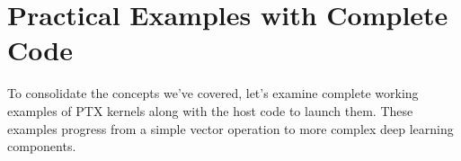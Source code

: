 \section{Practical Examples with Complete Code}

To consolidate the concepts we've covered, let's examine complete working examples of PTX kernels along with the host code to launch them. These examples progress from a simple vector operation to more complex deep learning components.

